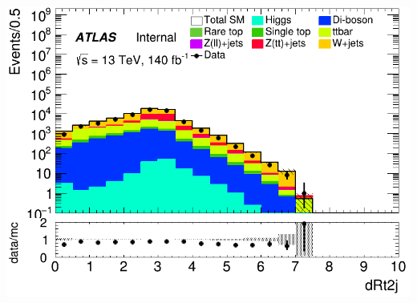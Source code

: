 \documentclass[usenames,dvipsnames]{beamer}
\begin{document}
\begin{frame}
\begin{minipage}{0.32\textwidth}
        \includegraphics[width=\textwidth]{graphics/LH_met/LH_met_dRt2j.png}
    \end{minipage}
    
    \vspace{0.5cm} %


\end{frame}
\end{document}

